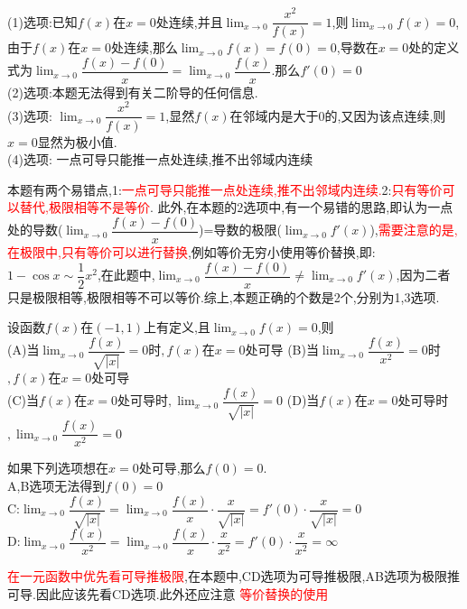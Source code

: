 \documentclass[8pt a4paper, oneside, UTF8]{ctexbook}  %
\begin{document}
\begin{sloppypar}
\begin{problem}
    \end{problem}
    \begin{solution}
        (1)选项:已知$f(x)$在$x=0$处连续,并且$\lim_{x\to 0}\dfrac{x^2}{f(x)}=1$,则$\lim_{x\to 0}f(x) =0$,由于$f(x)$在$x=0$处连续,那么$\lim_{x \to 0}f(x)=f(0)=0$,导数在$x=0$处的定义式为$\lim_{x\to 0}\dfrac{f(x)-f(0)}{x}=\lim_{x\to 0} \dfrac{f(x)}{x}$.那么$f'(0)=0$\\
        (2)选项:本题无法得到有关二阶导的任何信息.\\
        (3)选项: $\lim_{x\to 0} \dfrac{x^2}{f(x)}=1$,显然$f(x)$在邻域内是大于0的,又因为该点连续,则$x=0$显然为极小值. \\
        (4)选项: 一点可导只能推一点处连续,推不出邻域内连续
    \end{solution}
    \begin{note}
        本题有两个易错点,1:\textcolor{red}{一点可导只能推一点处连续,推不出邻域内连续.}2:\textcolor{red}{只有等价可以替代,极限相等不是等价}.\newline
        此外,在本题的2选项中,有一个易错的思路,即认为一点处的导数($\lim_{x\to 0}\dfrac{f(x)-f(0)}{x}$)=导数的极限($\lim_{x\to 0}f'(x)$),\textcolor{red}{需要注意的是,在极限中,只有等价可以进行替换},例如等价无穷小使用等价替换,即:$1-\cos x \sim \dfrac{1}{2}x^2$,在此题中,$\lim_{x\to 0}\dfrac{f(x)-f(0)}{x} \neq \lim_{x\to 0}f'(x)$,因为二者只是极限相等,极限相等不可以等价.综上,本题正确的个数是2个,分别为1,3选项.
    \end{note}
    \begin{problem}
    设函数$f(x)$在$(-1,1)$上有定义,且$\lim_{x\to0}f(x)=0$,则\\
    (A)当$\lim_{x\to 0}\dfrac{f(x)}{\sqrt{|x|}}=0$时$,f(x)$在$x=0$处可导
    (B)当$\lim_{x\to 0}\dfrac{f(x)}{x^{2}}=0$时$,f(x)$在$x=0$处可导\\
    (C)当$f(x)$在$x=0$处可导时$,\lim_{x\to0}\dfrac{f(x)}{\sqrt{|x|}}=0$\quad
    (D)当$f(x)$在$x=0$处可导时$,\lim_{x\to0}\dfrac{f(x)}{x^{2}}=0$
    \end{problem}
    \begin{solution}
        如果下列选项想在$x=0$处可导,那么$f(0)=0$.\\
        A,B选项无法得到$f(0)=0$\\
        C:$\lim_{x\to 0}\dfrac{f(x)}{\sqrt{|x|}}=\lim_{x\to 0} \dfrac{f(x)}{x}\cdot \dfrac{x}{\sqrt{|x|}}=f'(0)\cdot \dfrac{x}{\sqrt{|x|}}=0$\\
        D:$\lim_{x\to 0}\dfrac{f(x)}{x^2}=\lim_{x\to 0} \dfrac{f(x)}{x}\cdot \dfrac{x}{x^2}=f'(0)\cdot \dfrac{x}{x^2}=\infty$
    \end{solution}
    \begin{note}
        \textcolor{red}{在一元函数中优先看可导推极限},在本题中,CD选项为可导推极限,AB选项为极限推可导.因此应该先看CD选项.此外还应注意 \textcolor{red}{等价替换的使用}
    \end{note}

\end{sloppypar}
\end{document}
